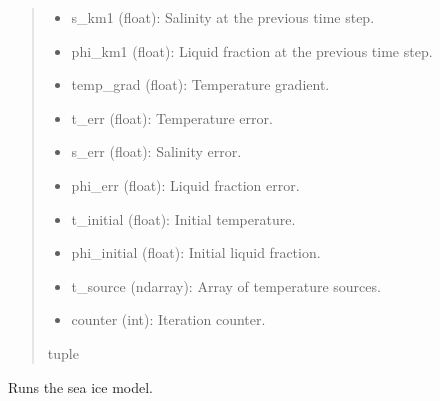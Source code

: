 \documentclass[a4paper,11pt,english,openany]{sphinxmanual}
\begin{document}
\begin{fulllineitems}
\begin{fulllineitems}
\begin{quote}
\begin{description}
\begin{description}
\begin{itemize}
\item {} 
\sphinxAtStartPar
s\_km1 (float): Salinity at the previous time step.

\item {} 
\sphinxAtStartPar
phi\_km1 (float): Liquid fraction at the previous time step.

\item {} 
\sphinxAtStartPar
temp\_grad (float): Temperature gradient.

\item {} 
\sphinxAtStartPar
t\_err (float): Temperature error.

\item {} 
\sphinxAtStartPar
s\_err (float): Salinity error.

\item {} 
\sphinxAtStartPar
phi\_err (float): Liquid fraction error.

\item {} 
\sphinxAtStartPar
t\_initial (float): Initial temperature.

\item {} 
\sphinxAtStartPar
phi\_initial (float): Initial liquid fraction.

\item {} 
\sphinxAtStartPar
t\_source (ndarray): Array of temperature sources.

\item {} 
\sphinxAtStartPar
counter (int): Iteration counter.

\end{itemize}

\end{description}


\sphinxAtStartPar
tuple

\end{description}\end{quote}

\end{fulllineitems}


\begin{fulllineitems}
\label{\detokenize{api/spyice.models.sea_ice_model:spyice.models.sea_ice_model.SeaIceModel.run_sea_ice_model}}
\pysigstartsignatures
{}
\pysigstopsignatures
\sphinxAtStartPar
Runs the sea ice model.


\end{fulllineitems}
\end{fulllineitems}
\end{document}
